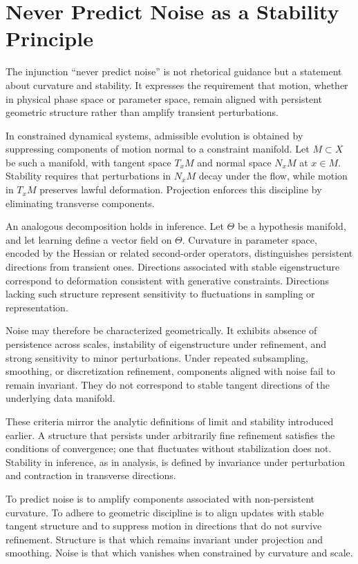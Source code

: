 \documentclass[12pt]{book}
\begin{document}
\section{Never Predict Noise as a Stability Principle}

The injunction ``never predict noise'' is not rhetorical guidance but a statement about curvature and stability. It expresses the requirement that motion, whether in physical phase space or parameter space, remain aligned with persistent geometric structure rather than amplify transient perturbations.

In constrained dynamical systems, admissible evolution is obtained by suppressing components of motion normal to a constraint manifold. Let $M \subset X$ be such a manifold, with tangent space $T_x M$ and normal space $N_x M$ at $x \in M$. Stability requires that perturbations in $N_x M$ decay under the flow, while motion in $T_x M$ preserves lawful deformation. Projection enforces this discipline by eliminating transverse components.

An analogous decomposition holds in inference. Let $\Theta$ be a hypothesis manifold, and let learning define a vector field on $\Theta$. Curvature in parameter space, encoded by the Hessian or related second-order operators, distinguishes persistent directions from transient ones. Directions associated with stable eigenstructure correspond to deformation consistent with generative constraints. Directions lacking such structure represent sensitivity to fluctuations in sampling or representation.

Noise may therefore be characterized geometrically. It exhibits absence of persistence across scales, instability of eigenstructure under refinement, and strong sensitivity to minor perturbations. Under repeated subsampling, smoothing, or discretization refinement, components aligned with noise fail to remain invariant. They do not correspond to stable tangent directions of the underlying data manifold.

These criteria mirror the analytic definitions of limit and stability introduced earlier. A structure that persists under arbitrarily fine refinement satisfies the conditions of convergence; one that fluctuates without stabilization does not. Stability in inference, as in analysis, is defined by invariance under perturbation and contraction in transverse directions.

To predict noise is to amplify components associated with non-persistent curvature. To adhere to geometric discipline is to align updates with stable tangent structure and to suppress motion in directions that do not survive refinement. Structure is that which remains invariant under projection and smoothing. Noise is that which vanishes when constrained by curvature and scale.
\end{document}
